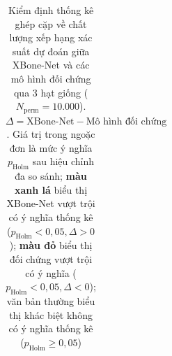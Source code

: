 \begin{table}[H]
{\begin{tabular}{|l|l|c|c|}
\end{tabular}
}
\caption{Kiểm định thống kê ghép cặp về chất lượng xếp hạng xác suất dự đoán giữa XBone-Net và các mô hình đối chứng qua 3 hạt giống ($N_{\mathrm{perm}}=10.000$). $\Delta = \text{XBone-Net} - \text{Mô hình đối chứng}$. Giá trị trong ngoặc đơn là mức ý nghĩa $p_{\mathrm{Holm}}$ sau hiệu chỉnh đa so sánh; \textcolor[RGB]{0, 135, 0}{\textbf{màu xanh lá}} biểu thị XBone-Net vượt trội có ý nghĩa thống kê ($p_{\mathrm{Holm}} < 0{,}05, \Delta > 0$); \textcolor[RGB]{200, 0, 0}{\textbf{màu đỏ}} biểu thị đối chứng vượt trội có ý nghĩa ($p_{\mathrm{Holm}} < 0{,}05, \Delta < 0$); văn bản thường biểu thị khác biệt không có ý nghĩa thống kê ($p_{\mathrm{Holm}} \ge 0{,}05$)}
\label{tab:paired_baseline_ranking}
\end{table}
